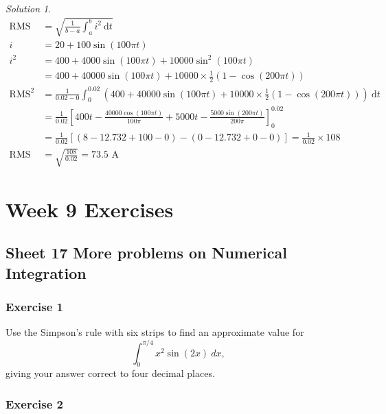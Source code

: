 \documentclass[
  11pt,
  oneside]{book}
\newcommand{\slide}{}
\theoremstyle{definition}
\theoremstyle{definition}
\theoremstyle{definition}
\theoremstyle{definition}
\theoremstyle{remark}
\newtheorem*{solution}{Solution}
\begin{document}
\begin{solution}
\begin{align*}
\text{RMS}&= \sqrt{\frac{1}{b-a}\int_a^b i^2\ \mathrm{d}t}\\
i&=20+100\sin(100\pi t)\\
i^2&=400+4000\sin(100\pi t)+10000\sin^2(100\pi t)\\
&=400+40000\sin(100\pi t)+10000\times\frac 12(1-\cos(200\pi t))\\
\text{RMS}^2&=\frac1{0.02-0}\int_0^{0.02}(400+40000\sin(100\pi t)+10000\times\frac 12(1-\cos(200\pi t)))\ \mathrm{d}t\\
&=\frac1{0.02}\left[400t-\frac{40000\cos(100\pi t)}{100\pi}+5000t-\frac{5000\sin(200\pi t)}{200\pi}\right]_0^{0.02}\\
&=\frac1{0.02}\left[(8-12.732+100-0)-(0-12.732+0-0)\right] = \frac1{0.02}\times108\\
\text{RMS}&=\sqrt{\frac{108}{0.02}}=73.5\text{ A}
\end{align*}
\end{solution}

\chapter*{Week 9 Exercises}\label{week-9-exercises}

\section{Sheet 17 More problems on Numerical Integration}\label{sheet-17-more-problems-on-numerical-integration}

\slide

\subsection*{Exercise 1}\label{exercise-1-8}

Use the Simpson's rule with six strips to find an approximate value for
\[
\int_0^{\pi/4}x^2\sin(2x)\ dx,
\]
giving your answer correct to four decimal places.

\slide

\subsection*{Exercise 2}\label{exercise-2-8}
\end{document}
